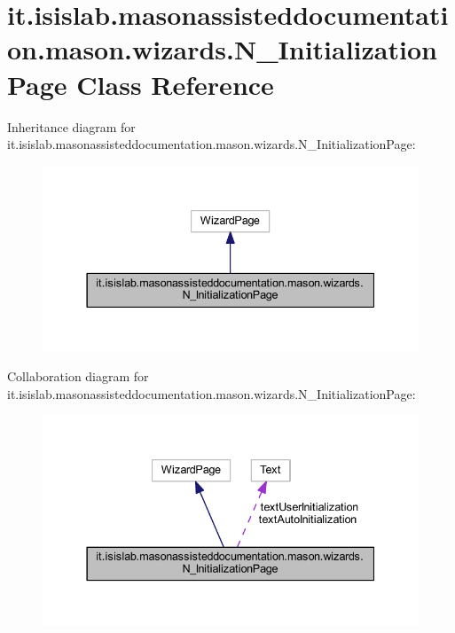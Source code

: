 \hypertarget{classit_1_1isislab_1_1masonassisteddocumentation_1_1mason_1_1wizards_1_1_n___initialization_page}{\section{it.\-isislab.\-masonassisteddocumentation.\-mason.\-wizards.\-N\-\_\-\-Initialization\-Page Class Reference}
\label{classit_1_1isislab_1_1masonassisteddocumentation_1_1mason_1_1wizards_1_1_n___initialization_page}
}


Inheritance diagram for it.\-isislab.\-masonassisteddocumentation.\-mason.\-wizards.\-N\-\_\-\-Initialization\-Page\-:\nopagebreak
\begin{figure}[H]
\begin{center}
\leavevmode
\includegraphics[width=337pt]{classit_1_1isislab_1_1masonassisteddocumentation_1_1mason_1_1wizards_1_1_n___initialization_page__inherit__graph}
\end{center}
\end{figure}


Collaboration diagram for it.\-isislab.\-masonassisteddocumentation.\-mason.\-wizards.\-N\-\_\-\-Initialization\-Page\-:\nopagebreak
\begin{figure}[H]
\begin{center}
\leavevmode
\includegraphics[width=337pt]{classit_1_1isislab_1_1masonassisteddocumentation_1_1mason_1_1wizards_1_1_n___initialization_page__coll__graph}
\end{center}
\end{figure}
